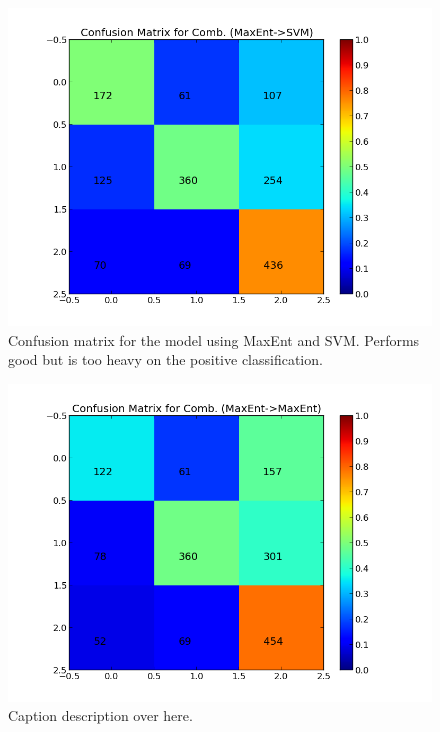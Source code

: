 \begin{minipage}[s]{\linewidth}
     \begin{minipage}{0.45\linewidth}
          \begin{figure}[H]
               \includegraphics[width=\linewidth]{../img/plots/grid/confusion_matrix_Comb-MaxEnt-SVM.png}
           \caption[Plot showing the confusion matrix for two-step MaxEnt -> SVM]{Confusion matrix for the model using MaxEnt and SVM. Performs good but is too heavy on the positive classification.}
           \label{fig:confmat_maxent_svm}
          \end{figure}
     \end{minipage}
     \hspace{0.05\linewidth}
     \begin{minipage}{0.45\linewidth}
          \begin{figure}[H]
               \includegraphics[width=\linewidth]{../img/plots/grid/confusion_matrix_Comb-MaxEnt-MaxEnt.png}
           \caption[Results overview across models]{Caption description over here.}
           \label{fig:confmat_maxent_maxent}
          \end{figure}
     \end{minipage}
\end{minipage}

